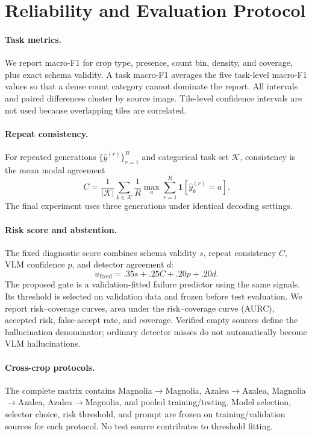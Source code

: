 \section{Reliability and Evaluation Protocol}
\label{sec:eval}

\paragraph{Task metrics.}
We report macro-F1 for crop type, presence, count bin, density, and coverage,
plus exact schema validity.  A task macro-F1 averages the five task-level
macro-F1 values so that a dense count category cannot dominate the report.
All intervals and paired differences cluster by source image.  Tile-level
confidence intervals are not used because overlapping tiles are correlated.

\paragraph{Repeat consistency.}
For repeated generations $\{\hat y^{(r)}\}_{r=1}^{R}$ and categorical task set
$\mathcal{K}$, consistency is the mean modal agreement
\begin{equation}
C=\frac{1}{|\mathcal{K}|}\sum_{k\in\mathcal{K}}
\frac{1}{R}\max_{a}\sum_{r=1}^{R}\mathbf{1}[\hat y_k^{(r)}=a].
\label{eq:consistency}
\end{equation}
The final experiment uses three generations under identical decoding settings.

\paragraph{Risk score and abstention.}
The fixed diagnostic score combines schema validity $s$, repeat consistency
$C$, VLM confidence $p$, and detector agreement $d$:
\begin{equation}
u_{\mathrm{fixed}}=.35s+.25C+.20p+.20d.
\label{eq:fixed-gate}
\end{equation}
The proposed gate is a validation-fitted failure predictor using the same
signals.  Its threshold is selected on validation data and frozen before test
evaluation.  We report risk--coverage curves, area under the risk--coverage
curve (AURC), accepted risk, false-accept rate, and coverage.  Verified empty
sources define the hallucination denominator; ordinary detector misses do not
automatically become VLM hallucinations.

\paragraph{Cross-crop protocols.}
The complete matrix contains Magnolia$\rightarrow$Magnolia,
Azalea$\rightarrow$Azalea, Magnolia$\rightarrow$Azalea,
Azalea$\rightarrow$Magnolia, and pooled training/testing.  Model selection,
selector choice, risk threshold, and prompt are frozen on training/validation
sources for each protocol.  No test source contributes to threshold fitting.

